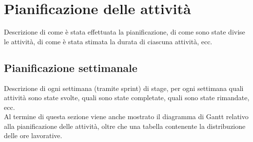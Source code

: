 \section{Pianificazione delle attività}
\label{sez:pianificazione-attivita}

Descrizione di come è stata effettuata la pianificazione, di come sono state divise le attività, di come è stata stimata la durata di ciascuna attività, ecc.\\

\subsection{Pianificazione settimanale}
\label{sez:pianificazione-settimanale}

Descrizione di ogni settimana (tramite sprint) di stage, per ogni settimana quali attività sono state svolte, quali sono state completate, quali sono state rimandate, ecc.\\
Al termine di questa sezione viene anche mostrato il diagramma di Gantt relativo alla pianificazione delle attività, oltre che una tabella contenente la distribuzione 
delle ore lavorative.\\